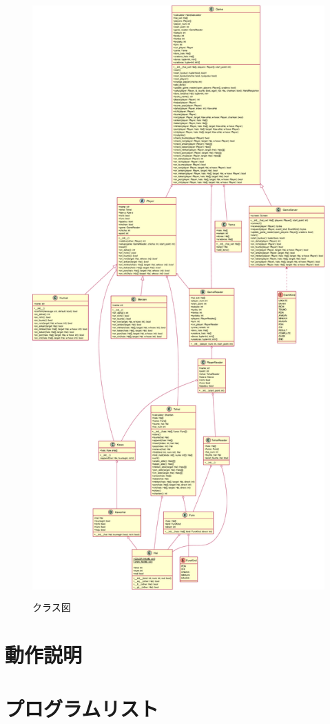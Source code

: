 \documentclass[a4j,titlepage]{jsarticle}
\begin{document}
\begin{figure}[p]
  \centering
  \includegraphics[height=23cm]{images/mahjong.pdf}
  \caption{クラス図}
  \label{fig:class}
\end{figure}


\section{動作説明}


\section{プログラムリスト}
\end{document}
